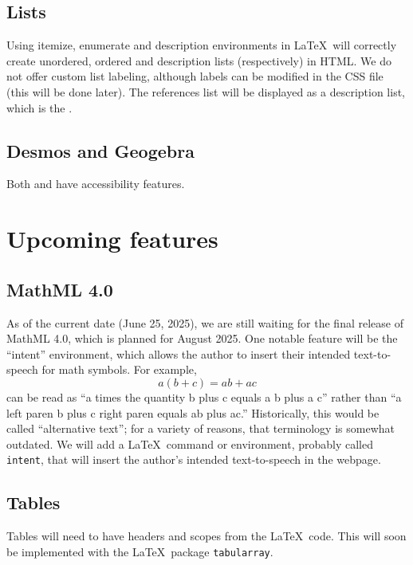 \documentclass{ximera}
\begin{document}
\subsection{Lists}
Using itemize, enumerate and description environments in \LaTeX\ will correctly create unordered, ordered and description lists (respectively) in HTML. We do not offer custom list labeling, although
labels can be modified in the CSS file (this will be done later). The references list will be displayed as a description list, which is the .

\subsection{Desmos and Geogebra}
Both  and  have accessibility features.


\section{Upcoming features}

\subsection{MathML 4.0}
As of the current date (June 25, 2025), we are still waiting for the final release of MathML 4.0, which is planned for August 2025.
One notable feature will be the ``intent'' environment, which allows the author to insert their intended text-to-speech for
math symbols. For example, 
\[
a(b+c) = ab + ac
\]
can be read as ``a times the quantity b plus c equals a b plus a c'' rather than ``a left paren b plus c right paren equals ab plus ac.''
Historically, this would be called ``alternative text''; for a variety of reasons, that terminology is somewhat outdated. 
We will add a \LaTeX\ command or environment, probably called \verb!intent!, that will insert the author's intended text-to-speech in the
webpage. 

\subsection{Tables}
Tables will need to have headers and scopes from the \LaTeX\ code. This will soon be implemented with the \LaTeX\ package \verb!tabularray!. 
\end{document}
